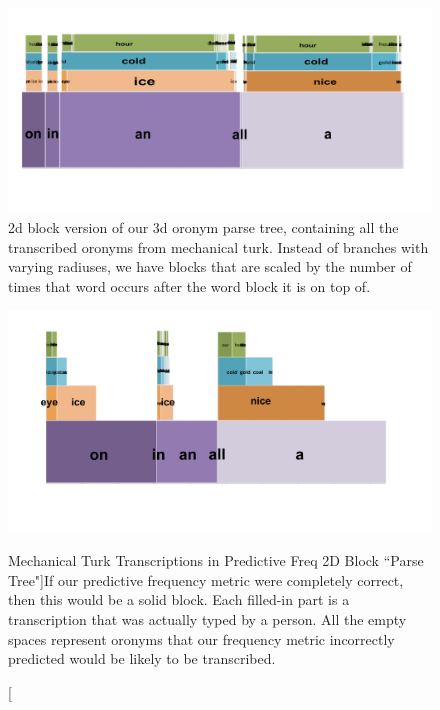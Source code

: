 \begin{figure}
\includegraphics[width=150mm]{mechTurkAnswersAllStackedBars.jpg}
\captionfonts
\caption[2d block version of our 3d oronym parse tree]{2d block version of our 3d oronym parse tree, containing all the transcribed oronyms from mechanical turk. Instead of branches with varying radiuses, we have blocks that are scaled by the number of times that word occurs after the word block it is on top of.}
\label{fig:blockParseStack_MechTurkAnswers}
\end{figure}


\begin{figure}
\includegraphics[width=150mm]{mechTurkStackedBars_scaledToPredictedFrequency.jpg}
\captionfonts
\caption[Mechanical Turk Transcriptions in Predictive Freq 2D Block ``Parse Tree"]{If our predictive frequency metric were completely correct, then this would be a solid block. Each filled-in part is a transcription that was actually typed by a person.  All the empty spaces represent oronyms that our frequency metric incorrectly predicted would be likely to be transcribed. }
\label{fig:blockParseStack_predictedMechTurkAnswers}
\end{figure}

